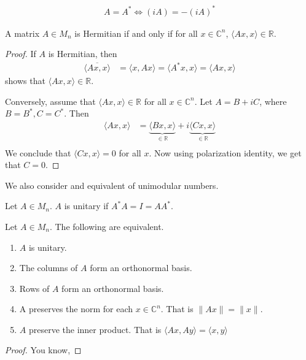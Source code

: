 \begin{proposition}
  \begin{align*}
    A = A^* \iff (iA) = -(iA)^*
  \end{align*}
\end{proposition}

\begin{proposition}
  A matrix $A \in M_n$ is Hermitian if and only if for all $x \in
  \mathbb{C}^n$, $ \langle Ax , x \rangle  \in \mathbb{R}$.
\end{proposition}
\begin{proof}
  If $A$ is Hermitian, then
  \begin{align*}
    \overline{\langle Ax , x \rangle } & = \langle x , Ax \rangle =
    \langle A^*x , x \rangle  = \langle Ax , x \rangle
  \end{align*}
  shows that $\langle  Ax , x \rangle  \in \mathbb{R}$.

  Conversely, assume that $\langle  Ax , x \rangle  \in \mathbb{R}$
  for all $x \in \mathbb{C}^n$. Let $ A = B + iC$, where $B= B^*, C =
  C^*$. Then
  \begin{align*}
    \langle Ax , x \rangle  &= \underbrace{\langle Bx , x
    \rangle}_{\in \mathbb{R}}  + i \underbrace{\langle Cx , x
    \rangle}_{\in \mathbb{R}}  \\
  \end{align*}
  We conclude that $\langle  Cx , x \rangle  = 0$ for all $x$. Now
  using polarization identity, we get that $C = 0$.
\end{proof}

We also consider and equivalent of unimodular numbers.

\begin{definition}
  Let $A \in M_n$. $A$ is unitary if $A^*A = I = AA^*$.
\end{definition}

\begin{proposition}
  Let $A \in M_n$. The following are equivalent.
  \begin{enumerate}[label=(\arabic*)]
    \item $A$ is unitary.
    \item The columns of $A$ form an orthonormal basis.
    \item Rows of $A$ form an orthonormal basis.
    \item A preserves the norm for each $x \in \mathbb{C}^n$. That is
      $\|Ax\| = \|x\|$.
    \item $A$ preserve the inner product. That is $\langle  Ax , Ay
      \rangle = \langle x , y \rangle$
  \end{enumerate}
\end{proposition}
\begin{proof}
  You know,
\end{proof}

